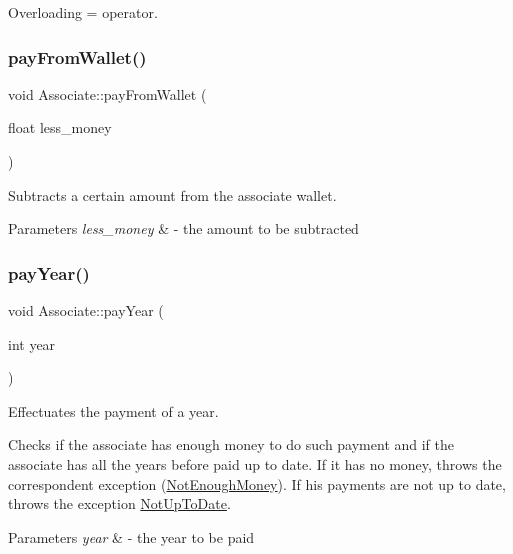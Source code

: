 Overloading = operator. 

\mbox{\label{classAssociate_a81f6e7e09ce00a9bf2a805d47d542b90}} 
\subsubsection{\texorpdfstring{pay\+From\+Wallet()}{payFromWallet()}}
{\footnotesize\ttfamily void Associate\+::pay\+From\+Wallet (\begin{DoxyParamCaption}\item[{float}]{less\+\_\+money }\end{DoxyParamCaption})}



Subtracts a certain amount from the associate wallet. 


\begin{DoxyParams}{Parameters}
{\em less\+\_\+money} & -\/ the amount to be subtracted \\
\hline
\end{DoxyParams}
\mbox{\label{classAssociate_ac5d76c7a552e5ad9149fc968511532bf}} 
\subsubsection{\texorpdfstring{pay\+Year()}{payYear()}}
{\footnotesize\ttfamily void Associate\+::pay\+Year (\begin{DoxyParamCaption}\item[{int}]{year }\end{DoxyParamCaption})}



Effectuates the payment of a year. 

Checks if the associate has enough money to do such payment and if the associate has all the years before paid up to date. If it has no money, throws the correspondent exception (\mbox{\hyperlink{classNotEnoughMoney}{Not\+Enough\+Money}}). If his payments are not up to date, throws the exception \mbox{\hyperlink{classNotUpToDate}{Not\+Up\+To\+Date}}.


\begin{DoxyParams}{Parameters}
{\em year} & -\/ the year to be paid \\
\hline
\end{DoxyParams}
\mbox{\label{classAssociate_a7c9f1c593da26eedc3a4f56302f67bec}} 
